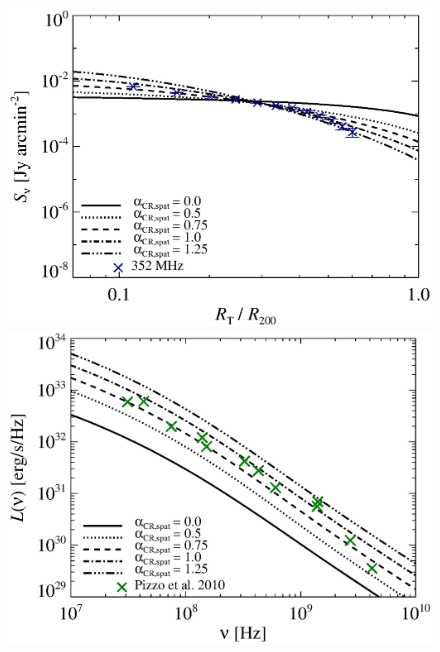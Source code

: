 \documentclass[a4paper,fleqn,usenatbib]{mnras}
\newcommand{\Mflatturb}{{\it M-turbulence}\xspace}
\begin{document}
\begin{figure}
\\
\begin{minipage}{1\columnwidth}
  \begin{center}%
    \includegraphics[width=\columnwidth]{prof.comp.KrTTDth.aCR.eps}
  \end{center}
\end{minipage}
\begin{minipage}{1\columnwidth}
   \begin{center}%
     \includegraphics[width=\columnwidth]{spec.comp.KrTTDth.aCR.eps}
   \end{center}
\end{minipage}

\end{figure}
\end{document}
